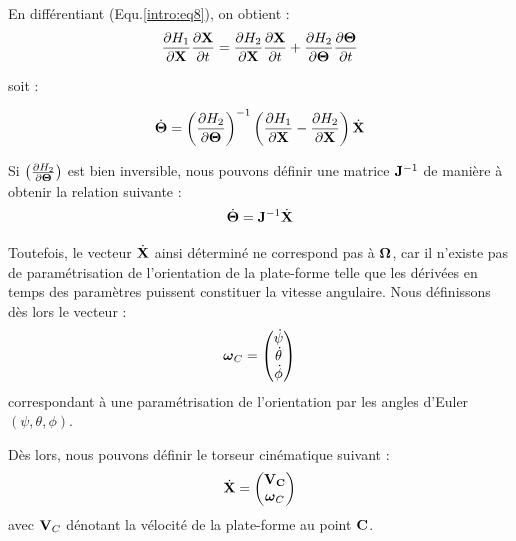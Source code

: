En différentiant (Equ.\ref{intro:eq8}), on obtient :
\begin{equation}
\frac{\partial H_1}{\partial {\bf X}} \frac{\partial {\bf X}}{\partial t} 
=  \frac{\partial H_2}{\partial {\bf X}} \frac{\partial {\bf X}}{\partial t} + 
\frac{\partial H_2}{\partial {\bf \Theta}} \frac{\partial {\bf 
\Theta}}{\partial t}
\label{intro:eq9}
\end{equation}

soit :

\begin{equation}
\dot {\bf \Theta} = \left ( \frac{\partial H_2}{\partial {\bf \Theta}} \right 
)^{-1} \left (\frac{\partial H_1}{\partial {\bf X}} - \frac{\partial 
H_2}{\partial {\bf X}} \right ) \dot {\bf X}
\label{intro:eq10}
\end{equation}

Si $\left ( \frac{\partial H_2}{\partial {\bf \Theta}} \right )$ est bien 
inversible, nous pouvons définir une matrice ${\bf J}^{-1}$ de manière à 
obtenir la 
relation suivante :
\begin{equation}
\dot {\bf \Theta} = {\bf J}^{-1} \dot {\bf X}
\label{intro:eq11}
\end{equation}

Toutefois, le vecteur $\dot {\bf X}$ ainsi d\'etermin\'e ne correspond pas \`a 
$\bf \Omega$, car il n'existe pas de paramétrisation de l'orientation de la plate-forme telle que les dérivées en temps des paramètres puissent constituer la vitesse angulaire. Nous définissons dès lors le vecteur :
\begin{equation}
\hbox{\boldmath $\omega$}_C = \left ( \begin{matrix}
                \dot \psi \\
                \dot \theta \\
                \dot \phi       
               \end{matrix} \right )
\label{intro:eq11d}
\end{equation}
correspondant à une paramétrisation de l'orientation par les angles d'Euler $(\psi, \theta, \phi)$.

Dès lors, nous pouvons définir le torseur cinématique suivant :
\begin{equation}
\dot {\bf X} = \left ( \begin{matrix}
                {\bf V_C} \\
		{\hbox{\boldmath $\omega$}_C}
               \end{matrix} \right )
\label{intro:eq11d}
\end{equation}
avec ${\bf V}_C$ dénotant la vélocité de la plate-forme au point $\bf C$.

